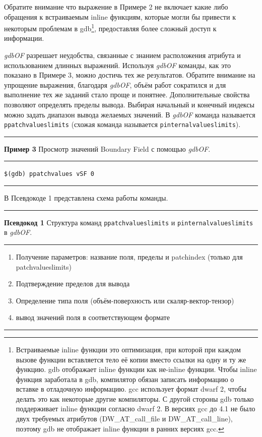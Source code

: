 \documentclass[a4paper,10pt]{book}
\begin{document}
Обратите внимание что выражение в Примере 2 не включает какие либо обращения к встраиваемым inline функциям, которые могли бы
привести к некоторым проблемам в gdb\footnote{Встраиваемые inline функции это оптимизация, при которой при каждом вызове
функции вставляется тело её копии вместо ссылки на одну и ту же функцию. gdb отображает inline функции как не-inline функции.
Чтобы inline функция заработала в gdb, компилятор обязан записать информацию о вставке в отладочную информацию. gcc использует
формат dwarf 2, чтобы делать это как некоторые другие компиляторы. С другой стороны gdb только поддерживает inline функции согласно
dwarf 2. В версиях gcc до 4.1 не было двух требуемых атрибутов (DW\_AT\_call\_file и DW\_AT\_call\_line), поэтому gdb не отображает
inline функции в ранних версиях gcc.}, предоставляя более сложный доступ к информации.

\vspace{2 mm}

\textit{gdbOF} разрешает неудобства, связанные с знанием расположения атрибута и использованием длинных выражений. Используя \textit{gdbOF}
команды, как это показано в Примере 3, можно достичь тех же результатов. Обратите внимание на упрощение выражения, благодаря \textit{gdbOF},
объём работ сократился и для выполнение тех же заданий стало проще и понятнее.
Дополнительные свойства позволяют определять пределы вывода. Выбирая начальный и конечный индексы можно задать диапазон вывода желаемых
значений. В \textit{gdbOF} команда называется \texttt{ppatchvalueslimits} (схожая команда называется \texttt{pinternalvalueslimits}).

\vspace{2 mm}
\hrule\smallskip
\textbf{Пример 3} Просмотр значений Boundary Field с помощью \textit{gdbOF}.
\smallskip\hrule
\vspace{2 mm}
\texttt{\$(gdb) ppatchvalues vSF 0}
\vspace{2 mm}
\smallskip\hrule
\vspace{5 mm}

В Псевдокоде 1 представлена схема работы команды.

\vspace{5 mm}
\hrule\smallskip
\textbf{Псевдокод 1} Структура команд \texttt{ppatchvalueslimits} и \texttt{pinternalvalueslimits} в \textit{gdbOF}.
\smallskip\hrule
\vspace{2 mm}
\small {\begin{enumerate}
         \item Получение параметров: название поля, пределы и patchindex (только для patchvalueslimits)
	 \item Подтверждение пределов для вывода
	\item Определение типа поля (объём-поверхность или скаляр-вектор-тензор)
	\item вывод значений поля в соответствующем формате

        \end{enumerate}
}
\vspace{2 mm}
\smallskip\hrule
\vspace{2 mm}
\end{document}
